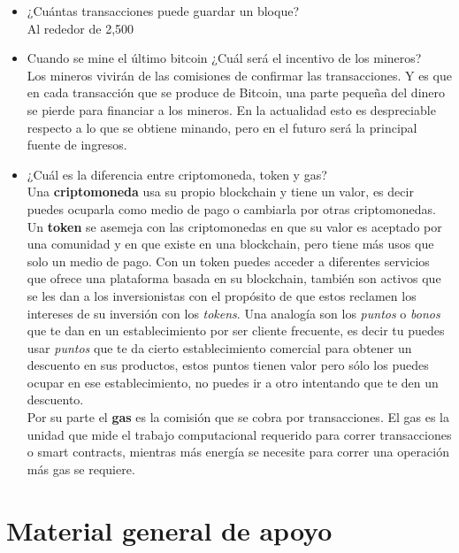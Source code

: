 \documentclass[a4paper,12pt]{/home/armando/Documentos/Cursos/LaTeX/Plantillas/lib/pub}
\begin{document}
\begin{itemize}
	\item ¿Cuántas transacciones puede guardar un bloque?\\
	Al rededor de 2,500
	\item Cuando se mine el último bitcoin ¿Cuál será el incentivo de los mineros?\\
	Los mineros vivirán de las comisiones de confirmar las transacciones. Y es que en cada transacción que se produce de Bitcoin, una parte pequeña del dinero se pierde para financiar a los mineros. En la actualidad esto es despreciable respecto a lo que se obtiene minando, pero en el futuro será la principal fuente de ingresos.
	\item ¿Cuál es la diferencia entre criptomoneda, token y gas?\\
	Una \textbf{criptomoneda} usa su propio blockchain y tiene un valor, es decir puedes ocuparla como medio de pago o cambiarla por otras criptomonedas. \\
	Un \textbf{token} se asemeja con las criptomonedas en que su valor es aceptado por una comunidad y en que existe en una blockchain, pero tiene más usos que solo un medio de pago. Con un token puedes acceder a diferentes servicios que ofrece una plataforma basada en su blockchain, también son activos que se les dan a los inversionistas con el propósito de que estos reclamen los intereses de su inversión con los \textit{tokens}. Una analogía son los \textit{puntos} o \textit{bonos} que te dan en un establecimiento por ser cliente frecuente, es decir tu puedes usar \textit{puntos} que te da cierto establecimiento comercial para obtener un descuento en sus productos, estos puntos tienen valor pero sólo los puedes ocupar en ese establecimiento, no puedes ir a otro intentando que te den un descuento.\\
	Por su parte el \textbf{gas} es la comisión que se cobra por transacciones. El gas es la unidad que mide el trabajo computacional requerido para correr transacciones o smart contracts, mientras más energía se necesite para correr una operación más gas se requiere.
\end{itemize}
\newpage
\section{Material general de apoyo}
\end{document}

